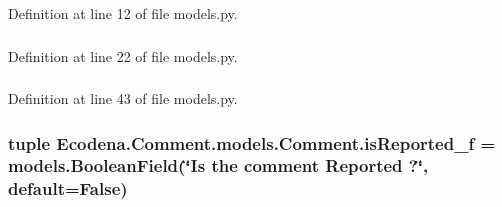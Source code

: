 Definition at line 12 of file models.py.

\hypertarget{class_ecodena_1_1_comment_1_1models_1_1_comment_ad5b1fd7419be638d296dad50d7336798}{
\subsubsection[{commentText\_\-f}]{}}
\label{d9/d86/class_ecodena_1_1_comment_1_1models_1_1_comment_ad5b1fd7419be638d296dad50d7336798}


Definition at line 22 of file models.py.

\hypertarget{class_ecodena_1_1_comment_1_1models_1_1_comment_aa690ec4009c2c1c783fdcd6d6ee29a6e}{
\subsubsection[{isReported\_\-f}]{}}
\label{d9/d86/class_ecodena_1_1_comment_1_1models_1_1_comment_aa690ec4009c2c1c783fdcd6d6ee29a6e}


Definition at line 43 of file models.py.

\hypertarget{class_ecodena_1_1_comment_1_1models_1_1_comment_ac146541041d0391dbe6820b161d3d467}{
\subsubsection[{isReported\_\-f}]{\setlength{\rightskip}{0pt plus 5cm}tuple {\bf Ecodena.Comment.models.Comment.isReported\_\-f} = models.BooleanField(\char`\"{}Is the comment Reported ?\char`\"{}, default=False)}}
\label{d9/d86/class_ecodena_1_1_comment_1_1models_1_1_comment_ac146541041d0391dbe6820b161d3d467}



